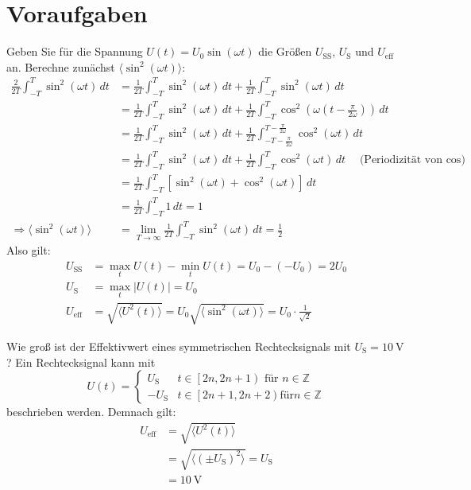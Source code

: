 \documentclass[ngerman]{scrartcl}
\theoremstyle{definition}
\begin{document}
	\section{Voraufgaben}
		\begin{voraufgabe}{Geben Sie für die Spannung $U(t) = U_0 \sin(\omega t)$ die Größen $U_\mathrm{SS}$, $U_\mathrm{S}$ und $U_\mathrm{eff}$ an.}
			Berechne zunächst $\langle \sin^2(\omega t) \rangle$:
			\begin{align*}
    \frac{2}{2T}\int_{-T}^T \sin^2(\omega t)\,dt 
    &= \frac{1}{2T}\int_{-T}^T \sin^2(\omega t)\,dt + \frac{1}{2T}\int_{-T}^T \sin^2(\omega t)\,dt \\
    &= \frac{1}{2T}\int_{-T}^T \sin^2(\omega t)\,dt + \frac{1}{2T}\int_{-T}^T \cos^2\left(\omega\left(t - \frac{\pi}{2\omega}\right)\right)\,dt \\
    &= \frac{1}{2T}\int_{-T}^T \sin^2(\omega t)\,dt + \frac{1}{2T}\int_{-T - \frac{\pi}{2\omega}}^{T - \frac{\pi}{2\omega}} \cos^2(\omega t)\,dt \\
    &= \frac{1}{2T}\int_{-T}^T \sin^2(\omega t)\,dt + \frac{1}{2T}\int_{-T}^{T} \cos^2(\omega t)\,dt \quad \text{(Periodizität von $\cos$)} \\
    &= \frac{1}{2T}\int_{-T}^T \left[\sin^2(\omega t) + \cos^2(\omega t)\right]\,dt \\
    &= \frac{1}{2T}\int_{-T}^T 1\,dt = 1 \\
    \Rightarrow \langle \sin^2(\omega t) \rangle &= \lim_{T \to \infty} \frac{1}{2T}\int_{-T}^T \sin^2(\omega t)\,dt = \frac{1}{2}
\end{align*}
Also gilt:
\begin{align*}
    U_\mathrm{SS} &= \max_t U(t) - \min_t U(t) = U_0 - (-U_0) = 2U_0 \\
    U_\mathrm{S} &= \max_t |U(t)| = U_0 \\
    U_\mathrm{eff} &= \sqrt{\langle U^2(t) \rangle} = U_0 \sqrt{\langle \sin^2(\omega t) \rangle} = U_0 \cdot \frac{1}{\sqrt{2}}
\end{align*}
		\end{voraufgabe}		
		\begin{voraufgabe}{Wie groß ist der Effektivwert eines symmetrischen Rechtecksignals mit $U_\mathrm{S} = \SI{10}{\volt} $?}			
			Ein Rechtecksignal kann mit 
			\begin{equation*}
				 U(t) = \begin{cases}
				U_\mathrm{S} & t \in \left[2n,2n+1\right) \text{ für } n \in \mathbb{Z}\\
				-U_\mathrm{S} & t \in \left[2n+1,2n+2\right) \mathrm{für} n \in \mathbb{Z}
			\end{cases}
			\end{equation*}
			beschrieben werden. Demnach gilt:
			\begin{align*}
				U_\mathrm{eff} &= \sqrt{\langle U^2(t) \rangle} \\
				&= \sqrt{\langle {(\pm U_\mathrm{S})}^2 \rangle}= U_{\mathrm{S}} \\
				&= \SI{10}{\volt}
			\end{align*}
		\end{voraufgabe}	
\end{document}
